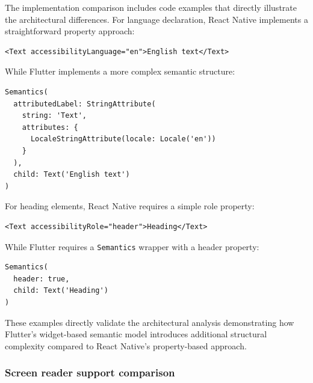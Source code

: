 \FloatBarrier

The implementation comparison includes code examples that directly illustrate the architectural differences. For language declaration, React Native implements a straightforward property approach:

\begin{lstlisting}[style=ReactNativeStyle, caption=React Native language declaration, label=lst:react-native-language, basicstyle=\ttfamily\footnotesize]
<Text accessibilityLanguage="en">English text</Text>
\end{lstlisting}

\FloatBarrier

While Flutter implements a more complex semantic structure:

\begin{lstlisting}[style=DartStyle, caption=Flutter language declaration, label=lst:flutter-language, basicstyle=\ttfamily\footnotesize]
Semantics(
  attributedLabel: StringAttribute(
    string: 'Text',
    attributes: {
      LocaleStringAttribute(locale: Locale('en'))
    }
  ),
  child: Text('English text')
)
\end{lstlisting}

\FloatBarrier

For heading elements, React Native requires a simple role property:

\begin{lstlisting}[style=ReactNativeStyle, caption=React Native heading element, label=lst:react-native-heading, basicstyle=\ttfamily\footnotesize]
<Text accessibilityRole="header">Heading</Text>
\end{lstlisting}

\FloatBarrier

While Flutter requires a \texttt{Semantics} wrapper with a header property:

\begin{lstlisting}[style=DartStyle, caption=Flutter heading element, label=lst:flutter-heading, basicstyle=\ttfamily\footnotesize]
Semantics(
  header: true,
  child: Text('Heading')
)
\end{lstlisting}

\FloatBarrier

These examples directly validate the architectural analysis demonstrating how Flutter's widget-based semantic model introduces additional structural complexity compared to React Native's property-based approach.

\subsubsection{Screen reader support comparison}
\label{subsubsec:screen-reader-support-comparison}

